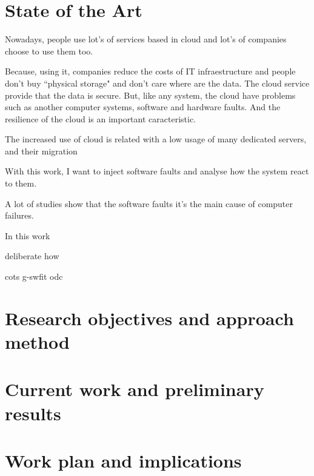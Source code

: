 \newpage
\section{State of the Art}

Nowadays, people use lot's of services based in cloud and lot's of companies choose to use them too.

Because, using it, companies reduce the costs of IT infraestructure and people don't buy ``physical storage" and don't care where are the data. The cloud service provide that the data is secure.
But, like any system, the cloud have problems such as another computer systems, software and hardware faults. And the resilience of the cloud is an important caracteristic.

The increased use of cloud is related with a low usage of many dedicated servers, and their migration 



With this work, I want to inject software faults and analyse how the system react to them.

A lot of studies show that the software faults it's the main cause of computer failures.

In this work

deliberate how 

\cite{duraes2006emulation}
\cite{wolter2012resilience}
\cite{avizzienisbasic}

\ac{cots}
\ac{g-swfit}
\ac{odc}


\newpage
\section{Research objectives and approach method}

\newpage
\section{Current work and preliminary results}

\newpage
\section{Work plan and implications}